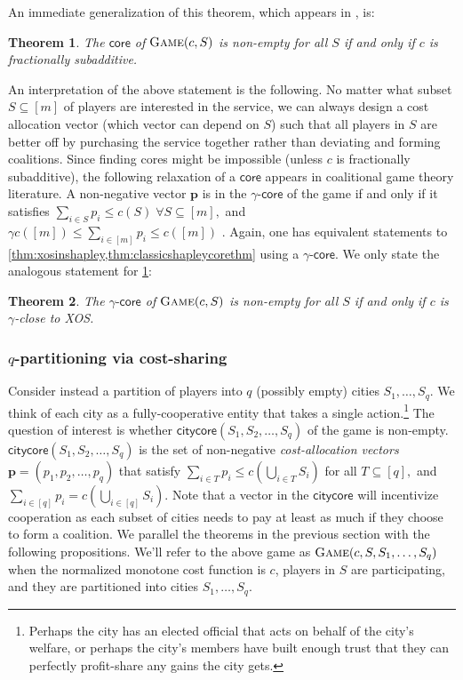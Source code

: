 \documentclass[11pt]{article}\usepackage{amsfonts}
\newtheorem{theorem}{Theorem}
\numberwithin{theorem}{subsection}
\newcommand{\game}{\textsc{Game}}
\newcommand{\core}{{\mathsf{core}}}
\newcommand{\gammacore}{\gamma\text{-}\mathsf{core}}
\newcommand{\citycore}{{\mathsf{citycore}}}
\begin{document}
\noindent
An immediate generalization of this theorem, which appears in \cite[Section 1.1]{Feige09}, is:

\noindent
\begin{theorem}
\label{thm:xosinshapley}
The $\core$ of $\game(c,S)$ is non-empty for all $S$ if and only if $c$ is fractionally subadditive.
\end{theorem}

An interpretation of the above statement is the following. No matter what subset $S\subseteq [m]$ of players are interested in the service, we can always design a cost allocation vector (which vector can depend on $S$) such that all players in $S$ are better off by purchasing the service together rather than deviating and forming coalitions.
Since finding cores might be impossible (unless $c$ is fractionally subadditive), the following
relaxation of a $\core$ appears in coalitional game theory literature. A non-negative vector $\mathbf{p}$ is in the $\gammacore$ of the game if and only if it satisfies $\sum_{i\in S}p_i \le c(S) \; \forall S\subseteq [m],$ and $\gamma c([m])\le \sum_{i\in [m]}p_i \le c([m])$ \cite[Definition 15.7]{AGTbook}.
Again, one has equivalent statements to \cref{thm:xosinshapley,thm:classicshapleycorethm} using a $\gammacore.$ We only state the analogous statement for \cref{thm:xosinshapley}:

\begin{theorem}
\label{thm:classicshapleygammacore}
The $\gammacore$ of $\game(c,S)$ is non-empty for all $S$ if and only if $c$ is $\gamma$-close to XOS.
\end{theorem}

\subsubsection{$q$-partitioning via cost-sharing}
Consider instead a partition of players into $q$ (possibly empty) cities $S_1,\ldots, S_q$. We think of each city as a fully-cooperative entity that takes a single action.\footnote{Perhaps the city has an elected official that acts on behalf of the city's welfare, or perhaps the city's members have built enough trust that they can perfectly profit-share any gains the city gets.} The question of interest is whether $\citycore(S_1, S_2, \ldots, S_q)$ of the game is non-empty. $\citycore(S_1, S_2, \ldots, S_q)$ is the set of non-negative \textit{cost-allocation vectors} $\mathbf{p} = (p_1, p_2, \ldots, p_q)$ that satisfy $\sum_{i\in T}p_i \le c(\bigcup_{i\in T}S_i)$ for all $T\subseteq [q],$ and $\sum_{i\in [q]}p_i = c(\bigcup_{i \in [q]}S_i).$ Note that a vector in the $\citycore$ will incentivize cooperation as each subset of cities needs to pay at least as much if they choose to form a coalition. We parallel the theorems in the previous section with the following propositions. We'll refer to the above game as $\game(c,S,S_1,\ldots, S_q)$ when the normalized monotone cost function is $c$, players in $S$ are participating, and they are partitioned into cities $S_1,\ldots, S_q$. 
\end{document}
